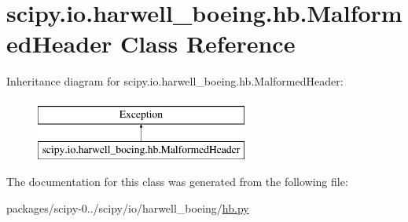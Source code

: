 \hypertarget{classscipy_1_1io_1_1harwell__boeing_1_1hb_1_1MalformedHeader}{}\section{scipy.\+io.\+harwell\+\_\+boeing.\+hb.\+Malformed\+Header Class Reference}
\label{classscipy_1_1io_1_1harwell__boeing_1_1hb_1_1MalformedHeader}
Inheritance diagram for scipy.\+io.\+harwell\+\_\+boeing.\+hb.\+Malformed\+Header\+:\begin{figure}[H]
\begin{center}
\leavevmode
\includegraphics[height=2.000000cm]{classscipy_1_1io_1_1harwell__boeing_1_1hb_1_1MalformedHeader}
\end{center}
\end{figure}


The documentation for this class was generated from the following file\+:\begin{DoxyCompactItemize}
\item 
packages/scipy-\/0../scipy/io/harwell\+\_\+boeing/\hyperlink{hb_8py}{hb.\+py}\end{DoxyCompactItemize}
